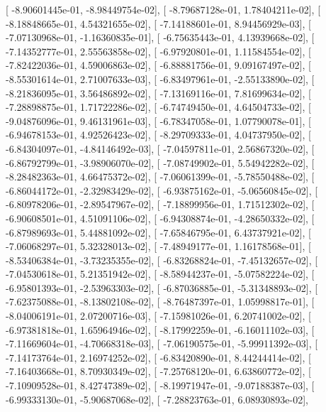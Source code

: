 \documentclass{article}
\begin{document}
       [ -8.90601445e-01,  -8.98449754e-02],
       [ -8.79687128e-01,   1.78404211e-02],
       [ -8.18848665e-01,   4.54321655e-02],
       [ -7.14188601e-01,   8.94456929e-03],
       [ -7.07130968e-01,  -1.16360835e-01],
       [ -6.75635443e-01,   4.13939668e-02],
       [ -7.14352777e-01,   2.55563858e-02],
       [ -6.97920801e-01,   1.11584554e-02],
       [ -7.82422036e-01,   4.59006863e-02],
       [ -6.88881756e-01,   9.09167497e-02],
       [ -8.55301614e-01,   2.71007633e-03],
       [ -6.83497961e-01,  -2.55133890e-02],
       [ -8.21836095e-01,   3.56486892e-02],
       [ -7.13169116e-01,   7.81699634e-02],
       [ -7.28898875e-01,   1.71722286e-02],
       [ -6.74749450e-01,   4.64504733e-02],
       [ -9.04876096e-01,   9.46131961e-03],
       [ -6.78347058e-01,   1.07790078e-01],
       [ -6.94678153e-01,   4.92526423e-02],
       [ -8.29709333e-01,   4.04737950e-02],
       [ -6.84304097e-01,  -4.84146492e-03],
       [ -7.04597811e-01,   2.56867320e-02],
       [ -6.86792799e-01,  -3.98906070e-02],
       [ -7.08749902e-01,   5.54942282e-02],
       [ -8.28482363e-01,   4.66475372e-02],
       [ -7.06061399e-01,  -5.78550488e-02],
       [ -6.86044172e-01,  -2.32983429e-02],
       [ -6.93875162e-01,  -5.06560845e-02],
       [ -6.80978206e-01,  -2.89547967e-02],
       [ -7.18899956e-01,   1.71512302e-02],
       [ -6.90608501e-01,   4.51091106e-02],
       [ -6.94308874e-01,  -4.28650332e-02],
       [ -6.87989693e-01,   5.44881092e-02],
       [ -7.65846795e-01,   6.43737921e-02],
       [ -7.06068297e-01,   5.32328013e-02],
       [ -7.48949177e-01,   1.16178568e-01],
       [ -8.53406384e-01,  -3.73235355e-02],
       [ -6.83268824e-01,  -7.45132657e-02],
       [ -7.04530618e-01,   5.21351942e-02],
       [ -8.58944237e-01,  -5.07582224e-02],
       [ -6.95801393e-01,  -2.53963303e-02],
       [ -6.87036885e-01,  -5.31348893e-02],
       [ -7.62375088e-01,  -8.13802108e-02],
       [ -8.76487397e-01,   1.05998817e-01],
       [ -8.04006191e-01,   2.07200716e-03],
       [ -7.15981026e-01,   6.20741002e-02],
       [ -6.97381818e-01,   1.65964946e-02],
       [ -8.17992259e-01,  -6.16011102e-03],
       [ -7.11669604e-01,  -4.70668318e-03],
       [ -7.06190575e-01,  -5.99911392e-03],
       [ -7.14173764e-01,   2.16974252e-02],
       [ -6.83420890e-01,   8.44244414e-02],
       [ -7.16403668e-01,   8.70930349e-02],
       [ -7.25768120e-01,   6.63860772e-02],
       [ -7.10909528e-01,   8.42747389e-02],
       [ -8.19971947e-01,  -9.07188387e-03],
       [ -6.99333130e-01,  -5.90687068e-02],
       [ -7.28823763e-01,   6.08930893e-02],
\end{document}
